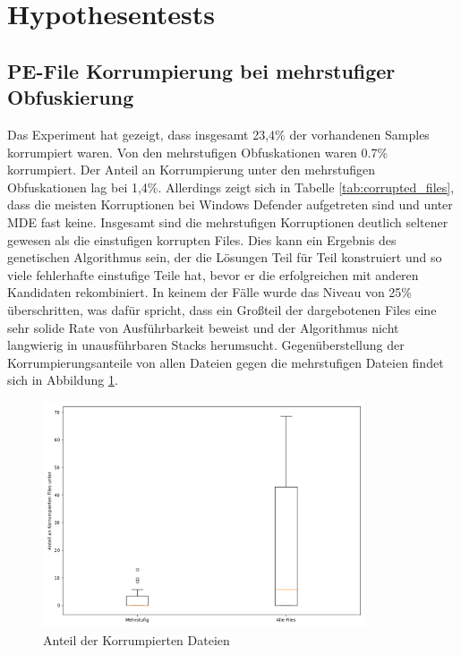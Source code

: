 \section{Hypothesentests}
\subsection{PE-File Korrumpierung bei mehrstufiger Obfuskierung}
Das Experiment hat gezeigt, dass insgesamt 23,4\% der vorhandenen Samples korrumpiert waren. Von den mehrstufigen Obfuskationen waren 0.7\% korrumpiert. Der Anteil an Korrumpierung unter den mehrstufigen Obfuskationen lag bei 1,4\%.  Allerdings zeigt sich in Tabelle \ref{tab:corrupted_files}, dass die meisten Korruptionen bei Windows Defender aufgetreten sind und unter MDE fast keine. Insgesamt sind die mehrstufigen Korruptionen deutlich seltener gewesen als die einstufigen korrupten Files. Dies kann ein Ergebnis des genetischen Algorithmus sein, der die Lösungen Teil für Teil konstruiert und so viele fehlerhafte einstufige Teile hat, bevor er die erfolgreichen mit anderen Kandidaten rekombiniert. 
In keinem der Fälle wurde das Niveau von 25\% überschritten, was dafür spricht, dass ein Großteil der dargebotenen Files eine sehr solide Rate von Ausführbarkeit beweist und der Algorithmus nicht langwierig in unausführbaren Stacks herumsucht. Gegenüberstellung der Korrumpierungsanteile von allen Dateien gegen die mehrstufigen Dateien findet sich in Abbildung \ref{fig:corrupt_vs_multi}.

\begin{figure}[h]
    \centering
    \includegraphics[width=0.85\textwidth]{gfx/Hypothesendiagramme/corruption_vs_multi_corruption.png}
    \caption{Anteil der Korrumpierten Dateien}
    \label{fig:corrupt_vs_multi}
\end{figure}

